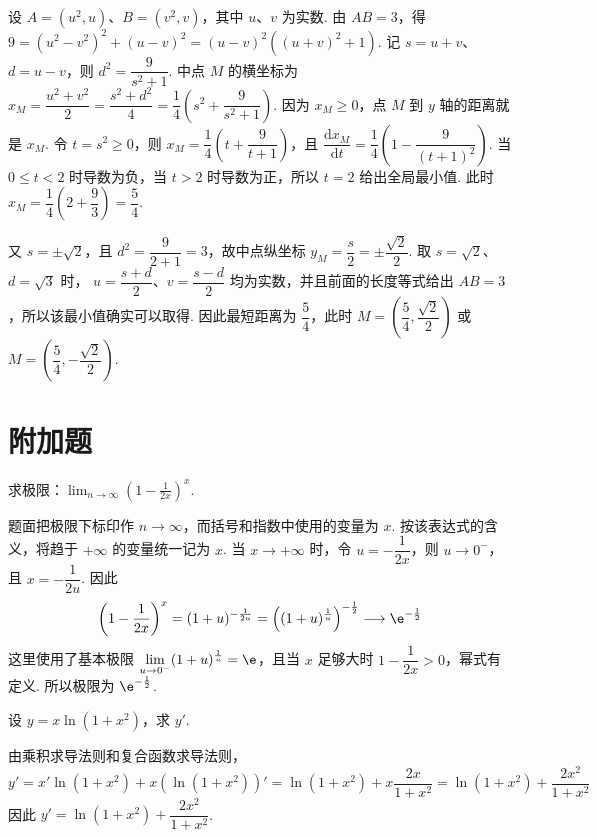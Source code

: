 \begin{solution}
设 \(A=(u^2,u)\)、\(B=(v^2,v)\)，其中 \(u\)、\(v\) 为实数. 由 \(AB=3\)，得
\(9=(u^2-v^2)^2+(u-v)^2=(u-v)^2\left((u+v)^2+1\right)\). 记 \(s=u+v\)、\(d=u-v\)，则 \(d^2=\dfrac{9}{s^2+1}\). 中点 \(M\) 的横坐标为 \(x_M=\dfrac{u^2+v^2}{2}=\dfrac{s^2+d^2}{4}=\dfrac14\left(s^2+\dfrac{9}{s^2+1}\right)\).
因为 \(x_M\geqslant0\)，点 \(M\) 到 \(y\) 轴的距离就是 \(x_M\). 令 \(t=s^2\geqslant0\)，则
\(x_M=\dfrac14\left(t+\dfrac{9}{t+1}\right)\)，且
\(\dfrac{\mathrm d x_M}{\mathrm dt}=\dfrac14\left(1-\dfrac{9}{(t+1)^2}\right)\).
当 \(0\leqslant t<2\) 时导数为负，当 \(t>2\) 时导数为正，所以 \(t=2\) 给出全局最小值. 此时
\(x_M=\dfrac14\left(2+\dfrac93\right)=\dfrac54\).

又 \(s=\pm\sqrt2\)，且 \(d^2=\dfrac9{2+1}=3\)，故中点纵坐标
\(y_M=\dfrac{s}{2}=\pm\dfrac{\sqrt2}{2}\). 取 \(s=\sqrt2\)、\(d=\sqrt3\) 时，
\(u=\dfrac{s+d}{2}\)、\(v=\dfrac{s-d}{2}\) 均为实数，并且前面的长度等式给出 \(AB=3\)，所以该最小值确实可以取得. 因此最短距离为 \(\dfrac54\)，此时
\(M=\left(\dfrac54,\dfrac{\sqrt2}{2}\right)\) 或 \(M=\left(\dfrac54,-\dfrac{\sqrt2}{2}\right)\).
\end{solution}


\section{附加题}

\begin{problem}

求极限：\(\displaystyle\lim_{n\to\infty}\left(1 - \frac{1}{2x}\right)^x\).
\end{problem}

\begin{solution}
题面把极限下标印作 \(n\to\infty\)，而括号和指数中使用的变量为 \(x\). 按该表达式的含义，将趋于 \(+\infty\) 的变量统一记为 \(x\). 当 \(x\to+\infty\) 时，令 \(u=-\dfrac{1}{2x}\)，则 \(u\to0^-\)，且 \(x=-\dfrac{1}{2u}\). 因此
\[
\left(1-\frac{1}{2x}\right)^x
=(1+u)^{-\frac{1}{2u}}
=\left((1+u)^{\frac1u}\right)^{-\frac12}
\longrightarrow\e^{-\frac12}
\]
这里使用了基本极限 \(\displaystyle\lim_{u\to0^-}(1+u)^{\frac{1}{u}}=\e\)，且当 \(x\) 足够大时 \(1-\dfrac1{2x}>0\)，幂式有定义. 所以极限为 \(\e^{-\frac12}\).
\end{solution}

\begin{problem}

设 \(y = x\ln\left(1 + x^2\right)\)，求 \(y'\).
\end{problem}

\begin{solution}
由乘积求导法则和复合函数求导法则，
\[
y'=x'\ln\left(1+x^2\right)+x\left(\ln\left(1+x^2\right)\right)'
=\ln\left(1+x^2\right)+x\frac{2x}{1+x^2}
=\ln\left(1+x^2\right)+\frac{2x^2}{1+x^2}
\]
因此 \(y'=\ln\left(1+x^2\right)+\dfrac{2x^2}{1+x^2}\).
\end{solution}

